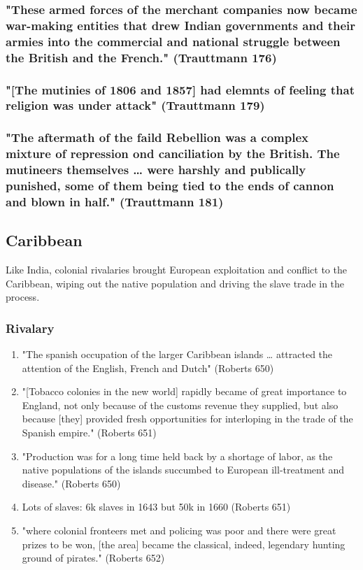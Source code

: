 \documentclass[11pt]{article}
\begin{document}
\subsubsection{"These armed forces of the merchant companies now became war-making entities that drew Indian governments and their armies into the commercial and national struggle between the British and the French." (Trauttmann 176)}
\label{sec:org31113c2}
\subsubsection{"[The mutinies of 1806 and 1857] had elemnts of feeling that religion was under attack" (Trauttmann 179)}
\label{sec:org7d36128}
\subsubsection{"The aftermath of the faild Rebellion was a complex mixture of repression ond canciliation by the British. The mutineers themselves \ldots{} were harshly and publically punished, some of them being tied to the ends of cannon and blown in half." (Trauttmann 181)}
\label{sec:org2e690dd}

\subsection{Caribbean}
\label{sec:org696781b}
Like India, colonial rivalaries brought European exploitation and conflict to the Caribbean, wiping out the native population and driving the slave trade in the process.

\subsubsection{Rivalary}
\label{sec:org49b466c}
\begin{enumerate}
\item "The spanish occupation of the larger Caribbean islands \ldots{} attracted the attention of the English, French and Dutch" (Roberts 650)
\label{sec:org15952ed}
\item "[Tobacco colonies in the new world] rapidly became of great importance to England, not only because of the customs revenue they supplied, but also because [they] provided fresh opportunities for interloping in the trade of the Spanish empire." (Roberts 651)
\label{sec:org81e6a2c}
\item "Production was for a long time held back by a shortage of labor, as the native populations of the islands succumbed to European ill-treatment and disease." (Roberts 650)
\label{sec:org1c0a59d}
\item Lots of slaves: 6k slaves in 1643 but 50k in 1660 (Roberts 651)
\label{sec:orgc0f2d81}
\item "where colonial fronteers met and policing was poor and there were great prizes to be won, [the area] became the classical, indeed, legendary hunting ground of pirates." (Roberts 652)
\label{sec:orgf787ffb}
\end{enumerate}
\end{document}
